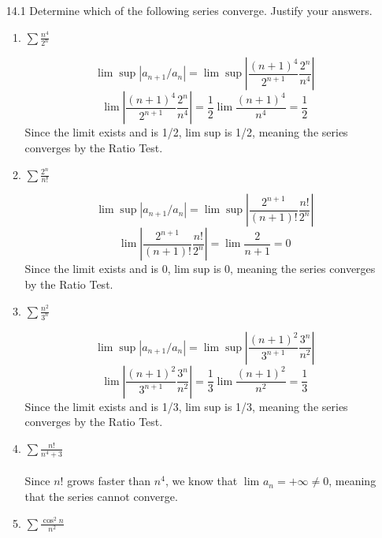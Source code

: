 
\usepackage{amsmath, dsfont}

\oddsidemargin 0in
\evensidemargin 0in
\textwidth 6.5in
\topmargin -0.5in
\textheight 9.0in
\newcommand{\norm}[1]{\left\lVert #1 \right\rVert}
\newcommand{\abs}[1]{\left\vert #1 \right\vert}
\newcommand{\?}{\stackrel{?}{=}}



\pagestyle{myheadings}

\begin{enumerate}
  \item [14.1]
    Determine which of the following series converge. Justify your answers.
    \begin{enumerate}
      \item $\sum \frac{n^4}{2^n}$

        $$\lim_{} \sup \abs{a_{n+1} / a_n} = \lim_{} \sup \abs{\frac{(n+1)^4}{2^{n+1}} \frac{2^n}{n^4}}$$
        $$\lim_{} \abs{\frac{(n+1)^4}{2^{n+1}} \frac{2^n}{n^4}} = \frac{1}{2} \lim_{} \frac{(n+1)^4}{n^4} = \frac{1}{2}$$
        Since the limit exists and is 1/2, lim sup is 1/2, meaning the series converges by the Ratio Test.
      \item $\sum \frac{2^n}{n!}$

        $$\lim_{} \sup \abs{a_{n+1} / a_n} = \lim_{} \sup \abs{\frac{2^{n+1}}{(n+1)!} \frac{n!}{2^n}}$$
        $$\lim_{} \abs{\frac{2^{n+1}}{(n+1)!} \frac{n!}{2^n}} = \lim_{} \frac{2}{n+1} = 0$$
        Since the limit exists and is 0, lim sup is 0, meaning the series converges by the Ratio Test.
      \item $\sum \frac{n^2}{3^n}$
        
        $$\lim_{} \sup \abs{a_{n+1} / a_n} = \lim_{} \sup \abs{\frac{(n+1)^2}{3^{n+1}} \frac{3^n}{n^2}}$$
        $$\lim_{} \abs{\frac{(n+1)^2}{3^{n+1}} \frac{3^n}{n^2}} = \frac{1}{3} \lim_{} \frac{(n+1)^2}{n^2} = \frac{1}{3}$$
        Since the limit exists and is 1/3, lim sup is 1/3, meaning the series converges by the Ratio Test.
      \item $\sum \frac{n!}{n^4 + 3}$\\\\

        Since $n!$ grows faster than $n^4$, we know that $\lim_{} a_n = + \infty \neq 0$, meaning that the series cannot converge. 
        
      \item $\sum \frac{\cos^2 n}{n^2}$\\\\


\end{enumerate}
\end{enumerate}
